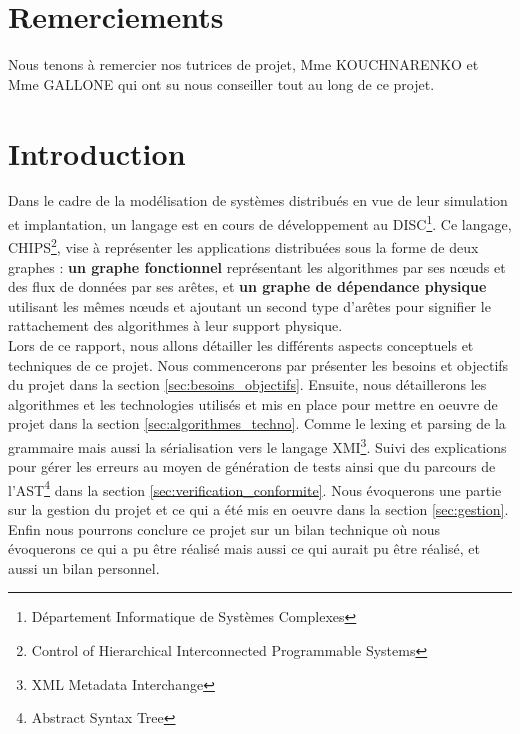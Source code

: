 \documentclass[a4paper, 11pt]{article}
\begin{document}
\justifying



\thispagestyle{empty}
\clearpage

\newpage

\section*{Remerciements}

Nous tenons à remercier nos tutrices de projet, Mme \textsc{KOUCHNARENKO} et Mme \textsc{GALLONE} 
qui ont su nous conseiller tout au long de ce projet.

\newpage

\newpage
\tableofcontents %
\newpage

\newpage
\setcounter{page}{1} %

\section{Introduction}


Dans le cadre de la modélisation de systèmes distribués en vue de leur simulation et implantation, un langage est en cours de développement au DISC\footnote{Département Informatique de Systèmes Complexes}. Ce langage, CHIPS\footnote{Control of Hierarchical Interconnected Programmable Systems}, vise à représenter les applications distribuées sous la forme de deux graphes : \textbf{un graphe fonctionnel} représentant les algorithmes par ses nœuds et des flux de données par ses arêtes, et \textbf{un graphe de dépendance physique} utilisant les mêmes nœuds et ajoutant un second type d'arêtes pour signifier le rattachement des algorithmes à leur support physique. \\
Lors de ce rapport, nous allons détailler les différents aspects conceptuels et techniques de ce projet. Nous commencerons par présenter les besoins et objectifs du projet dans la section \ref{sec:besoins_objectifs}. Ensuite, nous détaillerons les algorithmes et les technologies utilisés et mis en place pour mettre en oeuvre de projet dans la section \ref{sec:algorithmes_techno}. Comme le lexing et parsing de la grammaire mais aussi la sérialisation vers le langage XMI\footnote{XML Metadata Interchange}. Suivi des explications pour gérer les erreurs au moyen de génération de tests ainsi que du parcours de l'AST\footnote{Abstract Syntax Tree} dans la section \ref{sec:verification_conformite}. Nous évoquerons une partie sur la gestion du projet et ce qui a été mis en oeuvre dans la section \ref{sec:gestion}. Enfin nous pourrons conclure ce projet sur un bilan technique où nous évoquerons ce qui a pu être réalisé mais aussi ce qui aurait pu être réalisé, et aussi un bilan personnel.
\end{document}
